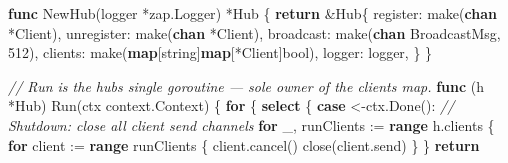 \documentclass[
]{article}
\newenvironment{Shaded}{}{}
\newcommand{\BuiltInTok}[1]{\textcolor[rgb]{0.00,0.50,0.00}{#1}}
\newcommand{\CommentTok}[1]{\textcolor[rgb]{0.38,0.63,0.69}{\textit{#1}}}
\newcommand{\ControlFlowTok}[1]{\textcolor[rgb]{0.00,0.44,0.13}{\textbf{#1}}}
\newcommand{\DataTypeTok}[1]{\textcolor[rgb]{0.56,0.13,0.00}{#1}}
\newcommand{\DecValTok}[1]{\textcolor[rgb]{0.25,0.63,0.44}{#1}}
\newcommand{\KeywordTok}[1]{\textcolor[rgb]{0.00,0.44,0.13}{\textbf{#1}}}
\newcommand{\NormalTok}[1]{#1}
\newcommand{\OperatorTok}[1]{\textcolor[rgb]{0.40,0.40,0.40}{#1}}
\begin{document}
\begin{Shaded}
\begin{Highlighting}[]
\KeywordTok{func}\NormalTok{ NewHub}\OperatorTok{(}\NormalTok{logger }\OperatorTok{*}\NormalTok{zap}\OperatorTok{.}\NormalTok{Logger}\OperatorTok{)} \OperatorTok{*}\NormalTok{Hub }\OperatorTok{\{}
    \ControlFlowTok{return} \OperatorTok{\&}\NormalTok{Hub}\OperatorTok{\{}
\NormalTok{        register}\OperatorTok{:}   \BuiltInTok{make}\OperatorTok{(}\KeywordTok{chan} \OperatorTok{*}\NormalTok{Client}\OperatorTok{),}
\NormalTok{        unregister}\OperatorTok{:} \BuiltInTok{make}\OperatorTok{(}\KeywordTok{chan} \OperatorTok{*}\NormalTok{Client}\OperatorTok{),}
\NormalTok{        broadcast}\OperatorTok{:}  \BuiltInTok{make}\OperatorTok{(}\KeywordTok{chan}\NormalTok{ BroadcastMsg}\OperatorTok{,} \DecValTok{512}\OperatorTok{),}
\NormalTok{        clients}\OperatorTok{:}    \BuiltInTok{make}\OperatorTok{(}\KeywordTok{map}\OperatorTok{[}\DataTypeTok{string}\OperatorTok{]}\KeywordTok{map}\OperatorTok{[*}\NormalTok{Client}\OperatorTok{]}\DataTypeTok{bool}\OperatorTok{),}
\NormalTok{        logger}\OperatorTok{:}\NormalTok{     logger}\OperatorTok{,}
    \OperatorTok{\}}
\OperatorTok{\}}

\CommentTok{// Run is the hub\textquotesingle{}s single goroutine — sole owner of the clients map.}
\KeywordTok{func} \OperatorTok{(}\NormalTok{h }\OperatorTok{*}\NormalTok{Hub}\OperatorTok{)}\NormalTok{ Run}\OperatorTok{(}\NormalTok{ctx context}\OperatorTok{.}\NormalTok{Context}\OperatorTok{)} \OperatorTok{\{}
    \ControlFlowTok{for} \OperatorTok{\{}
        \ControlFlowTok{select} \OperatorTok{\{}
        \ControlFlowTok{case} \OperatorTok{\textless{}{-}}\NormalTok{ctx}\OperatorTok{.}\NormalTok{Done}\OperatorTok{():}
            \CommentTok{// Shutdown: close all client send channels}
            \ControlFlowTok{for}\NormalTok{ \_}\OperatorTok{,}\NormalTok{ runClients }\OperatorTok{:=} \KeywordTok{range}\NormalTok{ h}\OperatorTok{.}\NormalTok{clients }\OperatorTok{\{}
                \ControlFlowTok{for}\NormalTok{ client }\OperatorTok{:=} \KeywordTok{range}\NormalTok{ runClients }\OperatorTok{\{}
\NormalTok{                    client}\OperatorTok{.}\NormalTok{cancel}\OperatorTok{()}
                    \BuiltInTok{close}\OperatorTok{(}\NormalTok{client}\OperatorTok{.}\NormalTok{send}\OperatorTok{)}
                \OperatorTok{\}}
            \OperatorTok{\}}
            \ControlFlowTok{return}


\end{Highlighting}
\end{Shaded}
\end{document}
